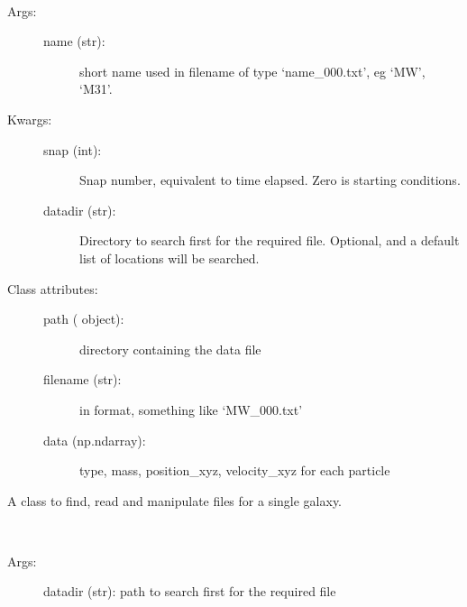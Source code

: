 \documentclass[letterpaper,10pt,english]{sphinxmanual}
\begin{document}
\begin{fulllineitems}
\label{\detokenize{galaxy:galaxy.galaxy.Galaxy}}~\begin{description}
\item[{Args: }] \leavevmode\begin{description}
\item[{name (str): }] \leavevmode
short name used in filename of type ‘name\_000.txt’, eg ‘MW’, ‘M31’.

\end{description}

\item[{Kwargs:}] \leavevmode\begin{description}
\item[{snap (int): }] \leavevmode
Snap number, equivalent to time elapsed. Zero is starting conditions.

\item[{datadir (str):}] \leavevmode
Directory to search first for the required file. Optional, and a 
default list of locations will be searched.

\end{description}

\item[{Class attributes:}] \leavevmode\begin{description}
\item[{path ( object): }] \leavevmode
directory containing the data file

\item[{filename (str):}] \leavevmode
in  format, something like ‘MW\_000.txt’

\item[{data (np.ndarray):}] \leavevmode
type, mass, position\_xyz, velocity\_xyz for each particle

\end{description}

\end{description}

A class to find, read and manipulate files for a single galaxy.

\begin{fulllineitems}
\label{\detokenize{galaxy:galaxy.galaxy.Galaxy.get_filepath}}~\begin{description}
\item[{Args:}] \leavevmode
datadir (str): path to search first for the required file


\end{description}
\end{fulllineitems}
\end{fulllineitems}
\end{document}
